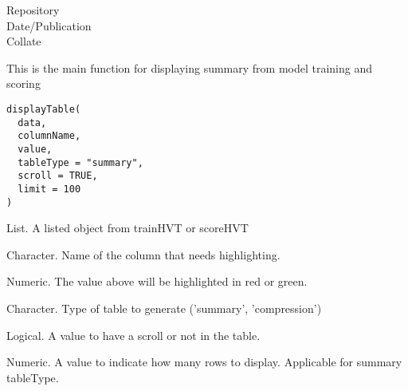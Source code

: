 \documentclass[letterpaper]{book}
\begin{document}
\begin{description}
\item[Repository]
\item[Date/Publication]
\item[Collate]
\end{description}
%
\begin{Description}
This is the main function for displaying summary from model training and scoring
\end{Description}
%
\begin{Usage}
\begin{verbatim}
displayTable(
  data,
  columnName,
  value,
  tableType = "summary",
  scroll = TRUE,
  limit = 100
)
\end{verbatim}
\end{Usage}
%
\begin{Arguments}
\begin{ldescription}
\item[\code{data}] List. A listed object from trainHVT or scoreHVT

\item[\code{columnName}] Character. Name of the column that needs highlighting.

\item[\code{value}] Numeric. The value above will be highlighted in red or green.

\item[\code{tableType}] Character. Type of table to generate ('summary', 'compression')

\item[\code{scroll}] Logical. A value to have a scroll or not in the table.

\item[\code{limit}] Numeric. A value to indicate how many rows to display.
Applicable for summary tableType.
\end{ldescription}
\end{Arguments}
\end{document}
